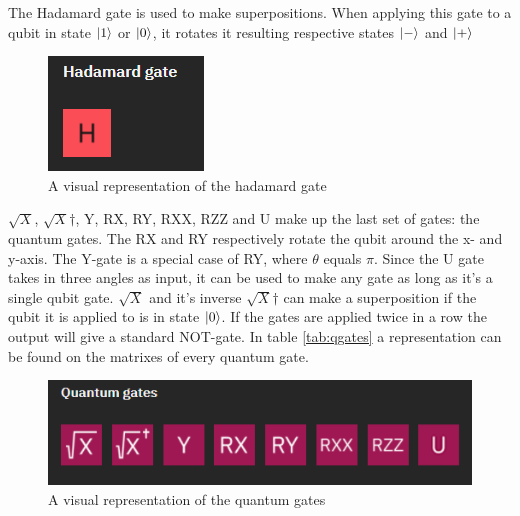 The Hadamard gate is used to make superpositions. When applying this gate to a qubit in state $\ket{1}$ or $\ket{0}$, it rotates it resulting respective states $\ket{-}$ and $\ket{+}$

\begin{figure} [h]
    \centering
    \includegraphics[width=\textwidth]{img/hadamard-gate.PNG}
        \caption{A visual representation of the hadamard gate \autocite{imggates}}
        \label{fig:hadamard gates}
\end{figure}

$\sqrt{X}$, $\sqrt{X}$$\dagger$, Y, RX, RY, RXX, RZZ and U make up the last set of gates: the quantum gates. 
The RX and RY respectively rotate the qubit around the x- and y-axis. The Y-gate is a special case of RY, where $\theta$ equals $\pi$.
Since the U gate takes in three angles as input, it can be used to make any gate as long as it's a single qubit gate.
$\sqrt{X}$ and it's inverse $\sqrt{X}$$\dagger$ can make a superposition if the qubit it is applied to is in state $\ket{0}$. If the gates are applied twice in a row the output will give a standard NOT-gate.
In table \ref{tab:qgates} a representation can be found on the matrixes of every quantum gate.

\begin{figure} [h]
    \centering
    \includegraphics[width=\textwidth]{img/quantum-gates.PNG}
        \caption{A visual representation of the quantum gates \autocite{imggates}}
        \label{fig:quantum gates}
\end{figure}

